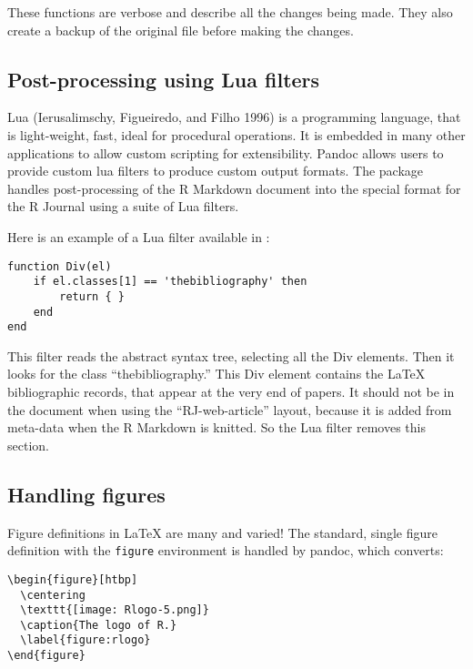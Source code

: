 These functions are verbose and describe all the changes being made. They also create a backup of the original file before making the changes.

\hypertarget{post-processing-using-lua-filters}{%
\subsection{Post-processing using Lua filters}\label{post-processing-using-lua-filters}}

Lua (Ierusalimschy, Figueiredo, and Filho 1996) is a programming language, that is light-weight, fast, ideal for procedural operations. It is embedded in many other applications to allow custom scripting for extensibility. Pandoc allows users to provide custom lua filters to produce custom output formats. The  package handles post-processing of the R Markdown document into the special format for the R Journal using a suite of Lua filters.

Here is an example of a Lua filter available in :

\begin{verbatim}
function Div(el)
    if el.classes[1] == 'thebibliography' then
        return { }
    end
end
\end{verbatim}

This filter reads the abstract syntax tree, selecting all the Div elements. Then it looks for the class ``thebibliography.'' This Div element contains the LaTeX bibliographic records, that appear at the very end of papers. It should not be in the document when using the ``RJ-web-article'' layout, because it is added from meta-data when the R Markdown is knitted. So the Lua filter removes this section.

\hypertarget{handling-figures}{%
\subsection{Handling figures}\label{handling-figures}}

Figure definitions in LaTeX are many and varied! The standard, single figure definition with the \texttt{figure} environment is handled by pandoc, which converts:

\begin{verbatim}
\begin{figure}[htbp]
  \centering
  \texttt{[image: Rlogo-5.png]}
  \caption{The logo of R.}
  \label{figure:rlogo}
\end{figure}
\end{verbatim}

